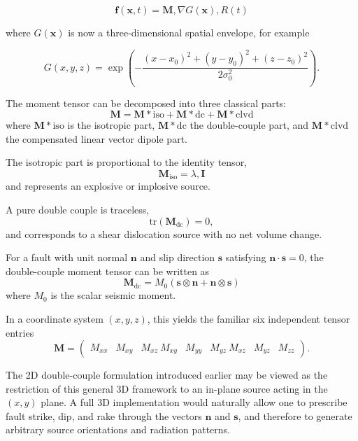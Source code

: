 \documentclass[11pt]{article}
\begin{document}
\begin{equation}
\bm{f}(\bm{x},t) = \bm{M} , \nabla G(\bm{x}) , R(t)
\end{equation}

where $G(\bm{x})$ is now a three-dimensional spatial envelope, for example

\begin{equation}
G(x,y,z) = \exp\left(-\frac{(x-x_0)^2 + (y-y_0)^2 + (z-z_0)^2}{2\sigma_0^2}\right).
\end{equation}

The moment tensor can be decomposed into three classical parts:
\begin{equation}
\bm{M} = \bm{M}*{\mathrm{iso}} + \bm{M}*{\mathrm{dc}} + \bm{M}*{\mathrm{clvd}}
\end{equation}
where $\bm{M}*{\mathrm{iso}}$ is the isotropic part, $\bm{M}*{\mathrm{dc}}$ the double-couple part, and $\bm{M}*{\mathrm{clvd}}$ the compensated linear vector dipole part.

The isotropic part is proportional to the identity tensor,
\begin{equation}
\bm{M}_{\mathrm{iso}} = \lambda , \bm{I}
\end{equation}
and represents an explosive or implosive source.

A pure double couple is traceless,
\begin{equation}
\mathrm{tr}(\bm{M}_{\mathrm{dc}})=0,
\end{equation}
and corresponds to a shear dislocation source with no net volume change.

For a fault with unit normal $\bm{n}$ and slip direction $\bm{s}$ satisfying $\bm{n}\cdot\bm{s}=0$, the double-couple moment tensor can be written as
\begin{equation}
\bm{M}_{\mathrm{dc}} = M_0 \left( \bm{s}\otimes\bm{n} + \bm{n}\otimes\bm{s} \right)
\end{equation}
where $M_0$ is the scalar seismic moment.

In a coordinate system $(x,y,z)$, this yields the familiar six independent tensor entries
\begin{equation}
\bm{M} =
\begin{pmatrix}
M_{xx} & M_{xy} & M_{xz} \
M_{xy} & M_{yy} & M_{yz} \
M_{xz} & M_{yz} & M_{zz}
\end{pmatrix}.
\end{equation}

The 2D double-couple formulation introduced earlier may be viewed as the restriction of this general 3D framework to an in-plane source acting in the $(x,y)$ plane. A full 3D implementation would naturally allow one to prescribe fault strike, dip, and rake through the vectors $\bm{n}$ and $\bm{s}$, and therefore to generate arbitrary source orientations and radiation patterns.
\end{document}
